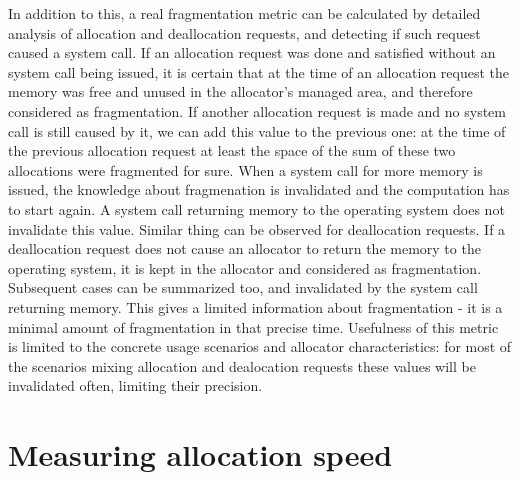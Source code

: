 In addition to this, a real fragmentation metric can be calculated by detailed analysis of allocation and deallocation requests, and detecting if such request caused a system call. If an allocation request was done and satisfied without an system call being issued, it is certain that at the time of an allocation request the memory was free and unused in the allocator's managed area, and therefore considered as fragmentation. If another allocation request is made and no system call is still caused by it, we can add this value to the previous one: at the time of the previous allocation request at least the space of the sum of these two allocations were fragmented for sure. When a system call for more memory is issued, the knowledge about fragmenation is invalidated and the computation has to start again. A system call returning memory to the operating system does not invalidate this value. Similar thing can be observed for deallocation requests. If a deallocation request does not cause an allocator to return the memory to the operating system, it is kept in the allocator and considered as fragmentation. Subsequent cases can be summarized too, and invalidated by the system call returning memory. This gives a limited information about fragmentation - it is a minimal amount of fragmentation in that precise time. Usefulness of this metric is limited to the concrete usage scenarios and allocator characteristics: for most of the scenarios mixing allocation and dealocation requests these values will be invalidated often, limiting their precision.

\section{Measuring allocation speed}

